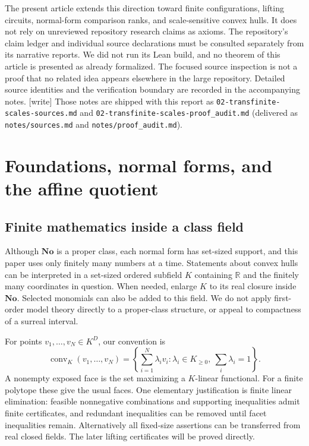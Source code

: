 \documentclass[11pt,a4paper]{article}
\numberwithin{equation}{section}
\theoremstyle{plain}
\newcommand{\wtag}{\textup{[write]}}%
\newcommand{\No}{\mathbf{No}}
\newcommand{\R}{\mathbb R}
\newcommand{\conv}{\operatorname{conv}}
\begin{document}
The present article extends this direction toward finite configurations,
lifting circuits, normal-form comparison ranks, and scale-sensitive convex
hulls. It does not rely on unreviewed repository research claims as axioms.
The repository's claim ledger and individual source declarations must be
consulted separately from its narrative reports. We did not run its Lean
build, and no theorem of this article is presented as already formalized.
The focused source inspection is not a proof that no related idea appears
elsewhere in the large repository. Detailed source identities and the
verification boundary are recorded in the accompanying notes.
\wtag{} Those notes are shipped with this report as
\nolinkurl{02-transfinite-scales-sources.md} and
\nolinkurl{02-transfinite-scales-proof_audit.md} (delivered as
\nolinkurl{notes/sources.md} and \nolinkurl{notes/proof_audit.md}).

\section{Foundations, normal forms, and the affine quotient}
\label{poly:sec:setup}

\subsection{Finite mathematics inside a class field}

Although $\No$ is a proper class, each normal form has set-sized support,
and this paper uses only finitely many numbers at a time. Statements about
convex hulls can be interpreted in a set-sized ordered subfield $K$ containing
$\R$ and the finitely many coordinates in question. When needed, enlarge
$K$ to its real closure inside $\No$. Selected monomials can also be added
to this field. We do not apply first-order model theory directly to a
proper-class structure, or appeal to compactness of a surreal interval.

For points $v_1,\ldots,v_N\in K^D$, our convention is
\[
 \conv_K(v_1,\ldots,v_N)
 =\left\{\sum_{i=1}^N\lambda_i v_i:
       \lambda_i\in K_{\ge0},\ \sum_i\lambda_i=1\right\}.
\]
A nonempty exposed face is the set maximizing a $K$-linear functional.
For a finite polytope these give the usual faces. One elementary
justification is finite linear elimination: feasible nonnegative
combinations and supporting inequalities admit finite certificates, and
redundant inequalities can be removed until facet inequalities remain.
Alternatively all fixed-size assertions can be transferred from real
closed fields. The later lifting certificates will be proved directly.
\end{document}

